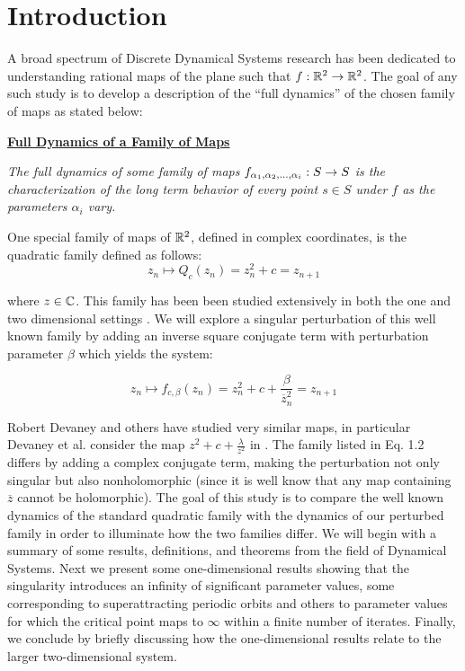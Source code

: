 \chapter{Introduction}

	A broad spectrum of Discrete Dynamical Systems research has been dedicated to understanding rational maps of the plane such that $f: \mathbb{R}^2 \rightarrow \mathbb{R}^2$. The goal of any such study is to develop a description of the ``full dynamics'' of the chosen family of maps as stated below:

	\underline{\textbf{Full Dynamics of a Family of Maps}}

	{\itshape The full dynamics of some family of maps $f_{\alpha_1, \alpha_2, \ldots, \alpha_i}: S \rightarrow S$ is the characterization of the long term behavior of every point $s \in S$ under $f$ as the parameters $\alpha_i$ vary.}

	One special family of maps of $\mathbb{R}^2$, defined in complex coordinates, is the quadratic family defined as follows:
	\begin{equation}
		z_n \mapsto Q_c (z_n) = z_n^2 + c = z_{n+1}
	\end{equation}
	
	where $z \in \mathbb{C}$. %
	 This family has been been studied extensively in both the one and two dimensional settings \cite{Dev1}. We will explore a singular perturbation of this well known family by adding an inverse square conjugate term with perturbation parameter $\beta$ which yields the system:

	\begin{equation}
	z_n \mapsto f_{c, \beta} (z_n) = z_{n}^2 + c + \frac{\beta}{\overline{z}_{n}^2} = z_{n+1}
	\end{equation}

	Robert Devaney and others have studied very similar maps, in particular Devaney et al. consider the map $z^2 + c + \frac{\lambda}{z^2}$ in \cite{sim}. The family listed in Eq. 1.2 differs by adding a complex conjugate term, making the perturbation not only singular but also nonholomorphic (since it is well know that any map containing $\overline{z}$ cannot be holomorphic).   The goal of this study is to compare the well known dynamics of the standard quadratic family with the dynamics of our perturbed family in order to illuminate how the two families differ. We will begin with a summary of some results, definitions, and theorems from the field of Dynamical Systems. Next we present some one-dimensional results showing that the singularity introduces an infinity of significant parameter values, some corresponding to superattracting periodic orbits and others to parameter values for which the critical point maps to $\infty$ within a finite number of iterates. %
	Finally, we conclude by briefly discussing how the one-dimensional results relate to the larger two-dimensional system.

\newpage
